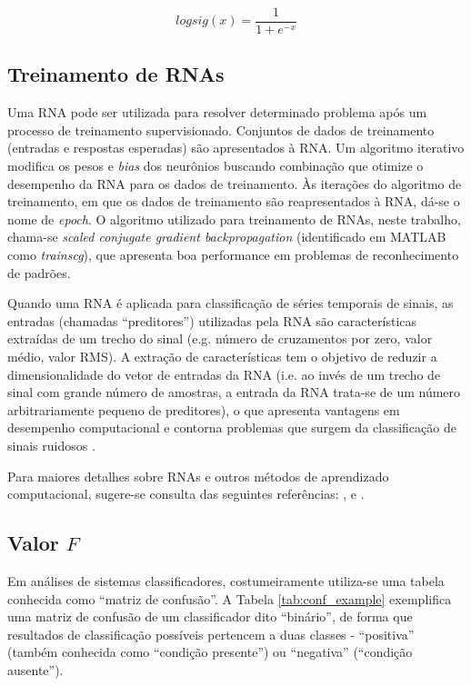 \begin{equation}
\label{eq:logsig}
	logsig(x) = \frac{1}{1+e^{-x}}
\end{equation}

			\subsection{Treinamento de RNAs}

Uma RNA pode ser utilizada para resolver determinado problema após um processo de treinamento supervisionado. Conjuntos de dados de treinamento (entradas e respostas esperadas) são apresentados à RNA. Um algoritmo iterativo modifica os pesos e \emph{bias} dos neurônios buscando combinação que otimize o desempenho da RNA para os dados de treinamento. Às iterações do algoritmo de treinamento, em que os dados de treinamento são reapresentados à RNA, dá-se o nome de \emph{epoch}. O algoritmo utilizado para treinamento de RNAs, neste trabalho, chama-se \emph{scaled conjugate gradient backpropagation} \cite{Moller1993} (identificado em MATLAB como \emph{trainscg}), que apresenta boa performance em problemas de reconhecimento de padrões.

Quando uma RNA é aplicada para classificação de séries temporais de sinais, as entradas (chamadas ``preditores'') utilizadas pela RNA são características extraídas de um trecho do sinal (e.g. número de cruzamentos por zero, valor médio, valor RMS). A extração de características tem o objetivo de reduzir a dimensionalidade do vetor de entradas da RNA (i.e. ao invés de um trecho de sinal com grande número de amostras, a entrada da RNA trata-se de um número arbitrariamente pequeno de preditores), o que apresenta vantagens em desempenho computacional e contorna problemas que surgem da classificação de sinais ruidosos \cite{Kim2000}.

Para maiores detalhes sobre RNAs e outros métodos de aprendizado computacional, sugere-se consulta das seguintes referências: ,  e .

			\subsection{Valor $F$}
Em análises de sistemas classificadores, costumeiramente utiliza-se uma tabela conhecida como ``matriz de confusão''. A Tabela \ref{tab:conf_example} exemplifica uma matriz de confusão de um classificador dito ``binário'', de forma que resultados de classificação possíveis pertencem a duas classes - ``positiva'' (também conhecida como ``condição presente'') ou ``negativa'' (``condição ausente'').

